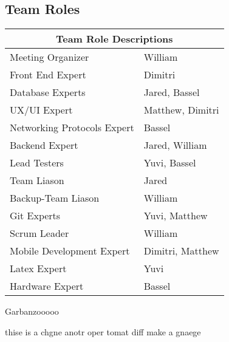 \documentclass{article}
\begin{document}
\subsection{Team Roles}
\begin{tabular}{ |p{5cm}|p{8cm}| }
	\hline
	\multicolumn{2}{|c|}{Team Role Descriptions} \\
	\hline
	Meeting Organizer & William \\
	\hline
	Front End Expert & Dimitri \\
	\hline
	Database Experts  & Jared, Bassel \\
	\hline
	UX/UI Expert & Matthew, Dimitri \\
	\hline
	Networking Protocols Expert & Bassel \\
	\hline
	Backend Expert & Jared, William \\
	\hline
	Lead Testers & Yuvi, Bassel \\
	\hline
	Team Liason & Jared \\
	\hline
	Backup-Team Liason & William \\
	\hline
	Git Experts & Yuvi, Matthew\\
	\hline
	Scrum Leader & William \\
	\hline
	Mobile Development Expert & Dimitri, Matthew \\
	\hline
	Latex Expert & Yuvi \\
	\hline
	Hardware Expert & Bassel \\
	\hline
\end{tabular}

\subsdaksml

Garbanzooooo

thise is a chgne anotr oper tomat diff make a gnaege
\end{document}
